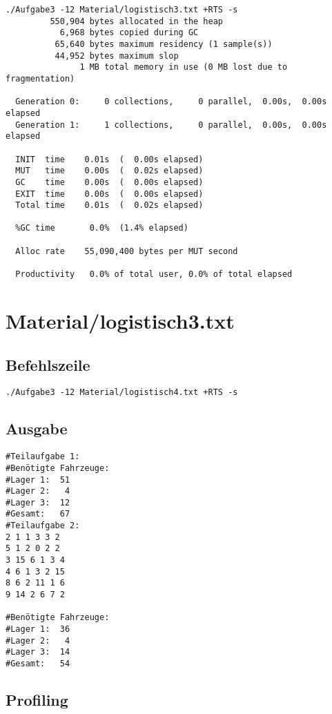 \documentclass{scrreprt}
\begin{document}
\begin{verbatim}
./Aufgabe3 -12 Material/logistisch3.txt +RTS -s 
         550,904 bytes allocated in the heap
           6,968 bytes copied during GC
          65,640 bytes maximum residency (1 sample(s))
          44,952 bytes maximum slop
               1 MB total memory in use (0 MB lost due to fragmentation)

  Generation 0:     0 collections,     0 parallel,  0.00s,  0.00s elapsed
  Generation 1:     1 collections,     0 parallel,  0.00s,  0.00s elapsed

  INIT  time    0.01s  (  0.00s elapsed)
  MUT   time    0.00s  (  0.02s elapsed)
  GC    time    0.00s  (  0.00s elapsed)
  EXIT  time    0.00s  (  0.00s elapsed)
  Total time    0.01s  (  0.02s elapsed)

  %GC time       0.0%  (1.4% elapsed)

  Alloc rate    55,090,400 bytes per MUT second

  Productivity   0.0% of total user, 0.0% of total elapsed
\end{verbatim}


\section{Material/logistisch3.txt}

\subsection*{Befehlszeile}

\begin{verbatim}
./Aufgabe3 -12 Material/logistisch4.txt +RTS -s
\end{verbatim}

\subsection*{Ausgabe}

\begin{verbatim}
#Teilaufgabe 1:
#Benötigte Fahrzeuge:
#Lager 1:  51
#Lager 2:   4
#Lager 3:  12
#Gesamt:   67
#Teilaufgabe 2:
2 1 1 3 3 2
5 1 2 0 2 2
3 15 6 1 3 4
4 6 1 3 2 15
8 6 2 11 1 6
9 14 2 6 7 2

#Benötigte Fahrzeuge:
#Lager 1:  36
#Lager 2:   4
#Lager 3:  14
#Gesamt:   54
\end{verbatim}

\subsection*{Profiling}
\end{document}
